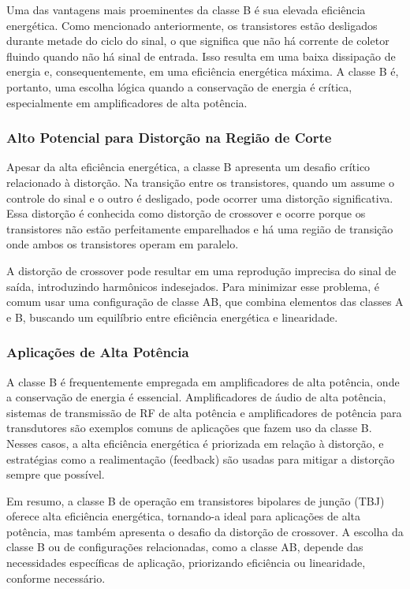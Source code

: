 Uma das vantagens mais proeminentes da classe B é sua elevada eficiência energética. Como mencionado anteriormente, os transistores estão desligados durante metade do ciclo do sinal, o que significa que não há corrente de coletor fluindo quando não há sinal de entrada. Isso resulta em uma baixa dissipação de energia e, consequentemente, em uma eficiência energética máxima. A classe B é, portanto, uma escolha lógica quando a conservação de energia é crítica, especialmente em amplificadores de alta potência.

\subsubsection{Alto Potencial para Distorção na Região de Corte}

Apesar da alta eficiência energética, a classe B apresenta um desafio crítico relacionado à distorção. Na transição entre os transistores, quando um assume o controle do sinal e o outro é desligado, pode ocorrer uma distorção significativa. Essa distorção é conhecida como distorção de crossover e ocorre porque os transistores não estão perfeitamente emparelhados e há uma região de transição onde ambos os transistores operam em paralelo.

A distorção de crossover pode resultar em uma reprodução imprecisa do sinal de saída, introduzindo harmônicos indesejados. Para minimizar esse problema, é comum usar uma configuração de classe AB, que combina elementos das classes A e B, buscando um equilíbrio entre eficiência energética e linearidade.

\subsubsection{Aplicações de Alta Potência}

A classe B é frequentemente empregada em amplificadores de alta potência, onde a conservação de energia é essencial. Amplificadores de áudio de alta potência, sistemas de transmissão de RF de alta potência e amplificadores de potência para transdutores são exemplos comuns de aplicações que fazem uso da classe B. Nesses casos, a alta eficiência energética é priorizada em relação à distorção, e estratégias como a realimentação (feedback) são usadas para mitigar a distorção sempre que possível.

Em resumo, a classe B de operação em transistores bipolares de junção (TBJ) oferece alta eficiência energética, tornando-a ideal para aplicações de alta potência, mas também apresenta o desafio da distorção de crossover. A escolha da classe B ou de configurações relacionadas, como a classe AB, depende das necessidades específicas de aplicação, priorizando eficiência ou linearidade, conforme necessário.

